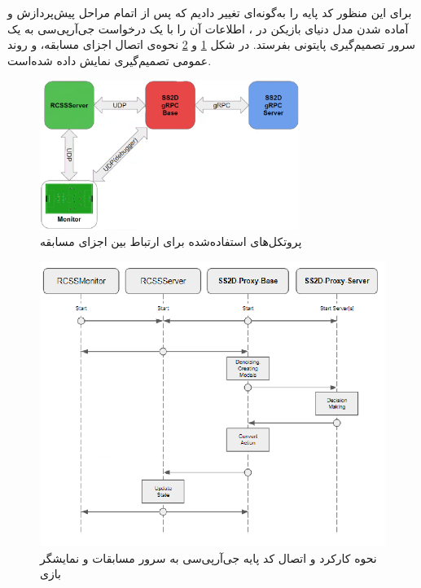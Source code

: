 برای این منظور کد پایه  را به‌گونه‌ای تغییر دادیم که
پس از اتمام مراحل پیش‌پردازش و آماده شدن مدل دنیای بازیکن
در ،
اطلاعات آن را با یک درخواست جی‌آرپی‌سی 
به یک سرور تصمیم‌گیری پایتونی بفرستد.
در شکل \ref{fig:connection} و \ref{fig:grpc_base}
نحوه‌ی اتصال اجزای مسابقه، و روند عمومی تصمیم‌گیری نمایش داده شده‌است.

\begin{figure}[H]
    \centering
    \includegraphics[width=0.75\textwidth]{images/connection_protocols.png}
    \caption{پروتکل‌های استفاده‌شده برای ارتباط بین اجزای مسابقه}\label{fig:connection}
    
\end{figure}

\begin{figure}[H]
    \centering
    \includegraphics[width=1\textwidth]{images/grpc_base.png}
    \caption{نحوه کارکرد و اتصال کد پایه جی‌آر‌پی‌سی به سرور مسابقات و نمایشگر بازی}\label{fig:grpc_base}
    
\end{figure}
